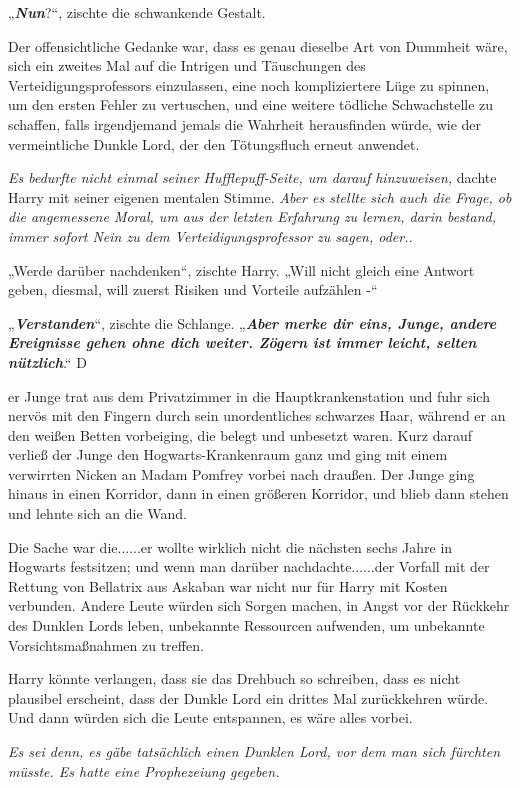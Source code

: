 {„\textbf{\emph{Nun}}?“, zischte die schwankende Gestalt.

Der offensichtliche Gedanke war, dass es genau dieselbe Art von Dummheit wäre, sich ein zweites Mal auf die Intrigen und Täuschungen des Verteidigungsprofessors einzulassen, eine noch kompliziertere Lüge zu spinnen, um den ersten Fehler zu vertuschen, und eine weitere tödliche Schwachstelle zu schaffen, falls irgendjemand jemals die Wahrheit herausfinden würde, wie der vermeintliche Dunkle Lord, der den Tötungsfluch erneut anwendet.

\emph{Es bedurfte nicht einmal seiner Hufflepuff-Seite, um darauf hinzuweisen,} dachte Harry mit seiner eigenen mentalen Stimme. \emph{Aber es stellte sich auch die Frage, ob die angemessene Moral, um aus der letzten Erfahrung zu lernen, darin bestand, immer sofort Nein zu dem Verteidigungsprofessor zu sagen, oder..}

„Werde darüber nachdenken“, zischte Harry. „Will nicht gleich eine Antwort geben, diesmal, will zuerst Risiken und Vorteile aufzählen -“

„\textbf{\emph{Verstanden}}“, zischte die Schlange. „\textbf{\emph{Aber merke dir eins, Junge, andere Ereignisse gehen ohne dich weiter. Zögern ist immer leicht, selten nützlich}}.“ D

er Junge trat aus dem Privatzimmer in die Hauptkrankenstation und fuhr sich nervös mit den Fingern durch sein unordentliches schwarzes Haar, während er an den weißen Betten vorbeiging, die belegt und unbesetzt waren. Kurz darauf verließ der Junge den Hogwarts-Krankenraum ganz und ging mit einem verwirrten Nicken an Madam Pomfrey vorbei nach draußen. Der Junge ging hinaus in einen Korridor, dann in einen größeren Korridor, und blieb dann stehen und lehnte sich an die Wand.

Die Sache war die......er wollte wirklich nicht die nächsten sechs Jahre in Hogwarts festsitzen; und wenn man darüber nachdachte......der Vorfall mit der Rettung von Bellatrix aus Askaban war nicht nur für Harry mit Kosten verbunden. Andere Leute würden sich Sorgen machen, in Angst vor der Rückkehr des Dunklen Lords leben, unbekannte Ressourcen aufwenden, um unbekannte Vorsichtsmaßnahmen zu treffen.

Harry könnte verlangen, dass sie das Drehbuch so schreiben, dass es nicht plausibel erscheint, dass der Dunkle Lord ein drittes Mal zurückkehren würde. Und dann würden sich die Leute entspannen, es wäre alles vorbei.

\emph{Es sei denn, es gäbe tatsächlich einen Dunklen Lord, vor dem man sich fürchten müsste. Es hatte eine Prophezeiung gegeben.}

}
